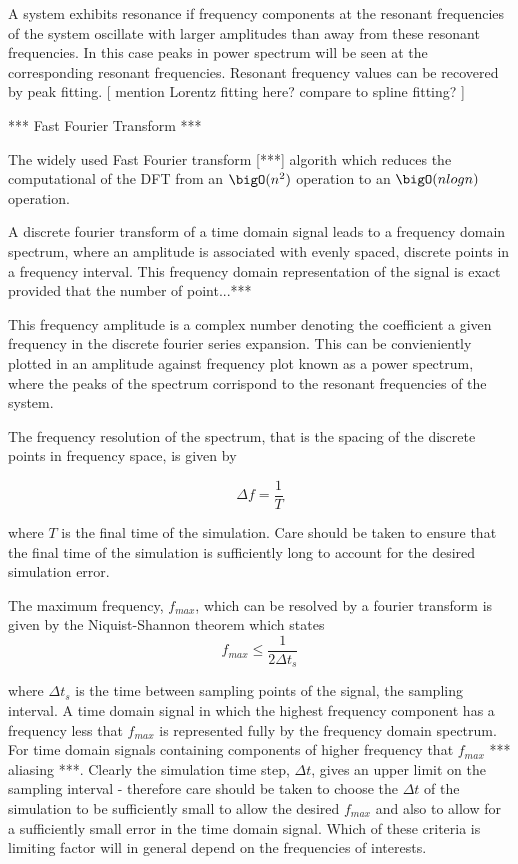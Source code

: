 A system exhibits resonance if frequency components at the resonant frequencies of the system oscillate with larger amplitudes than away from these resonant frequencies. In this case peaks in power spectrum will be seen at the corresponding resonant frequencies. Resonant frequency values can be recovered by peak fitting. [ mention Lorentz fitting here? compare to spline fitting? ]

*** Fast Fourier Transform ***

The widely used Fast Fourier transform [***] algorith which reduces the computational of the DFT from an $\bigO(n^2)$ operation to an $\bigO(n log n)$ operation.

A discrete fourier transform of a time domain signal leads to a frequency domain spectrum, where an amplitude is associated with evenly spaced, discrete points in a frequency interval. This frequency domain representation of the signal is exact provided that the number of point...***

This frequency amplitude is a complex number denoting the coefficient a given frequency in the discrete fourier series expansion.  This can be convieniently plotted in an amplitude against frequency plot known as a power spectrum, where the peaks of the spectrum corrispond to the resonant frequencies of the system.

The frequency resolution of the spectrum, that is the spacing of the discrete points in frequency space, is given by

$$
\Delta f = \frac{1}{T}
$$

where $T$ is the final time of the simulation. Care should be taken to ensure that the final time of the simulation is sufficiently long to account for the desired simulation error.



The maximum frequency, $f_{max}$, which can be resolved by a fourier transform is given by the Niquist-Shannon theorem which states
$$
f_{max} \leq \frac{1}{2 \Delta t_s}
$$

where $\Delta t_s$ is the time between sampling points of the signal, the sampling interval. A time domain signal in which the highest frequency component has a frequency less that $f_{max}$ is represented fully by the frequency domain spectrum. For time domain signals containing components of higher frequency that $f_{max}$ *** aliasing ***.
Clearly the simulation time step, $\Delta t$, gives an upper limit on the sampling interval - therefore care should be taken to choose the $\Delta t$ of the simulation to be sufficiently small to allow the desired $f_{max}$ and also to allow for a sufficiently small error in the time domain signal. Which of these criteria is limiting factor will in general depend on the frequencies of interests.


